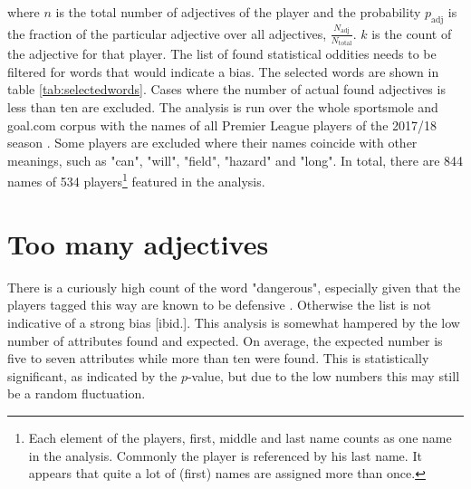 \documentclass[10pt, a4paper]{UUThesisTemplate}
\begin{document}
where $n$ is the total number of adjectives of the player and the probability $p_\text{adj}$ is the fraction of the particular adjective over all adjectives, $\frac{N_\text{adj}}{N_\text{total}}$. $k$ is the count of the adjective for that player. The list of found statistical oddities needs to be filtered for words that would indicate a bias. The selected words are shown in table \ref{tab:selectedwords}. Cases where the number of actual found adjectives is less than ten are excluded. The analysis is run over the whole sportsmole and goal.com corpus with the names of all Premier League players of the 2017/18 season \cite{playerlistpl}. Some players are excluded where their names coincide with other meanings, such as "can", "will", "field", "hazard" and "long". In total, there are 844 names of 534 players\footnote{Each element of the players, first, middle and last name counts as one name in the analysis. Commonly the player is referenced by his last name. It appears that quite a lot of (first) names are assigned more than once.} featured in the analysis.

\section{Too many adjectives}

There is a curiously high count of the word "dangerous", especially given that the players tagged this way are known to be defensive \cite{sumpter1}. Otherwise the list is not indicative of a strong bias [ibid.]. This analysis is somewhat hampered by the low number of attributes found and expected. On average, the expected number is five to seven attributes while more than ten were found. This is statistically significant, as indicated by the $p$-value, but due to the low numbers this may still be a random fluctuation.
\end{document}
